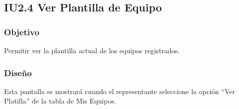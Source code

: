 \subsection{IU2.4 Ver Plantilla de Equipo}

\subsubsection{Objetivo}
	Permitir ver la plantilla actual de los equipos registrados.

\subsubsection{Diseño}
	Esta pantalla se mostrará cuando el representante seleccione la opción ``Ver Platilla'' de la tabla de Mis Equipos.

